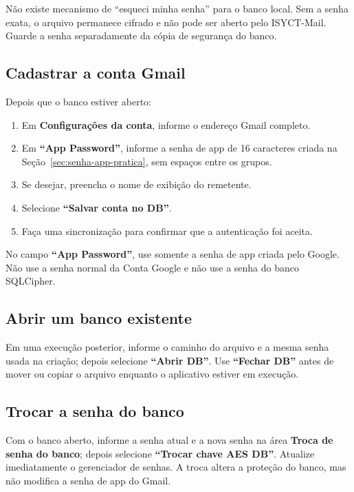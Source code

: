 \documentclass[11pt,a4paper]{article}
\newcommand{\uis}[1]{\textbf{``#1''}}
\newcommand{\menu}[1]{\textbf{#1}}
\begin{document}
\begin{importantbox}
  Não existe mecanismo de ``esqueci minha senha'' para o banco local. Sem a senha exata, o arquivo permanece cifrado e não pode ser aberto pelo ISYCT-Mail. Guarde a senha separadamente da cópia de segurança do banco.
\end{importantbox}

\subsection{Cadastrar a conta Gmail}

Depois que o banco estiver aberto:

\begin{enumerate}
  \item Em \menu{Configurações da conta}, informe o endereço Gmail completo.
  \item Em \uis{App Password}, informe a senha de app de 16 caracteres criada na Seção~\ref{sec:senha-app-pratica}, sem espaços entre os grupos.
  \item Se desejar, preencha o nome de exibição do remetente.
  \item Selecione \uis{Salvar conta no DB}.
  \item Faça uma sincronização para confirmar que a autenticação foi aceita.
\end{enumerate}

\begin{warningbox}
  No campo \uis{App Password}, use somente a senha de app criada pelo Google. Não use a senha normal da Conta Google e não use a senha do banco SQLCipher.
\end{warningbox}

\subsection{Abrir um banco existente}

Em uma execução posterior, informe o caminho do arquivo e a mesma senha usada na criação; depois selecione \uis{Abrir DB}. Use \uis{Fechar DB} antes de mover ou copiar o arquivo enquanto o aplicativo estiver em execução.

\subsection{Trocar a senha do banco}

Com o banco aberto, informe a senha atual e a nova senha na área \menu{Troca de senha do banco}; depois selecione \uis{Trocar chave AES DB}. Atualize imediatamente o gerenciador de senhas. A troca altera a proteção do banco, mas não modifica a senha de app do Gmail.
\end{document}
